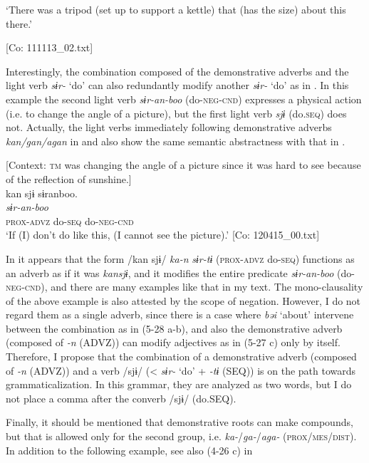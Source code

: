       ‘There was a tripod (set up to support a kettle) that (has the size) about this there.’

      [Co: 111113\_02.txt]
\z
\z

Interestingly, the combination composed of the demonstrative adverbs and the light verb \textit{sɨr-} ‘do’ can also redundantly modify another \textit{sɨr-} ‘do’ as in . In this example the second light verb \textit{sɨr-an-boo} (do-\textsc{neg-cnd}) expresses a physical action (i.e. to change the angle of a picture), but the first light verb \textit{sjɨ} (do.\textsc{seq}) does not. Actually, the light verbs immediately following demonstrative adverbs \textit{kan/gan/agan} in  and  also show the same semantic abstractness with that in .

\ea \label{ex:5:29}   [Context: \textsc{tm} was changing the angle of a picture since it was hard to see because of the reflection of sunshine.]\\
\glll  kan  sjɨ  sɨranboo.\\
\textit{}  \textit{}  \textit{sɨr-an-boo}\\
\textsc{prox}-\textsc{advz}  do-\textsc{seq}  do-\textsc{neg}-\textsc{cnd}\\
\glt ‘If (I) don’t do like this, (I cannot see the picture).’ [Co: 120415\_00.txt]
\z

In  it appears that the form /kan sjɨ/ \textit{ka-n} \textit{sɨr-tɨ} (\textsc{prox}-\textsc{advz} do-\textsc{seq}) functions as an adverb as if it was \textit{kansjɨ}, and it modifies the entire predicate \textit{sɨr-an-boo} (do-\textsc{neg}-\textsc{cnd}), and there are many examples like that in my text. The mono-clausality of the above example is also attested by the scope of negation. However, I do not regard them as a single adverb, since there is a case where \textit{bəi} ‘about’ intervene between the combination as in (5-28 a-b), and also the demonstrative adverb (composed of \textit{{}-n} (ADVZ)) can modify adjectives as in (5-27 c) only by itself. Therefore, I propose that the combination of a demonstrative adverb (composed of \textit{{}-n} (ADVZ)) and a verb /sjɨ/ (< \textit{sɨr-} ‘do’ + \textit{{}-tɨ} (SEQ)) is on the path towards grammaticalization. In this grammar, they are analyzed as two words, but I do not place a comma after the converb /sjɨ/ (do.SEQ).

  Finally, it should be mentioned that demonstrative roots can make compounds, but that is allowed only for the second group, i.e. \textit{ka-}/\textit{ga-}/\textit{aga-} (\textsc{prox}/\textsc{mes}/\textsc{dist}). In addition to the following example, see also (4-26 c) in 

